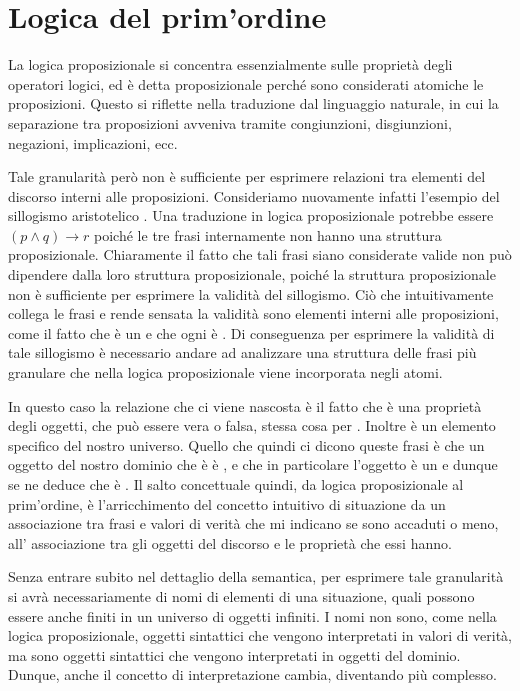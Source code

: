 \chapter{Logica del prim'ordine}

La logica proposizionale si concentra essenzialmente sulle proprietà degli operatori logici, ed è detta proposizionale perché sono considerati atomiche le proposizioni. Questo si riflette nella traduzione dal linguaggio naturale, in cui la separazione tra proposizioni avveniva tramite congiunzioni, disgiunzioni, negazioni, implicazioni, ecc.

Tale granularità però non è sufficiente per esprimere relazioni tra elementi del discorso interni alle proposizioni. Consideriamo nuovamente infatti l'esempio del sillogismo aristotelico . Una traduzione in logica proposizionale potrebbe essere \((p\land q)\to r\) poiché le tre frasi internamente non hanno una struttura proposizionale. Chiaramente il fatto che tali frasi siano considerate valide non può dipendere dalla loro struttura proposizionale, poiché la struttura proposizionale non è sufficiente per esprimere la validità del sillogismo. Ciò che intuitivamente collega le frasi e rende sensata la validità sono elementi interni alle proposizioni, come il fatto che  è un  e che ogni  è . Di conseguenza per esprimere la validità di tale sillogismo è necessario andare ad analizzare una struttura delle frasi più granulare che nella logica proposizionale viene incorporata negli atomi.

In questo caso la relazione che ci viene nascosta è il fatto che  è una proprietà degli oggetti, che può essere vera o falsa, stessa cosa per . Inoltre  è un elemento specifico del nostro universo. Quello che quindi ci dicono queste frasi è che un oggetto del nostro dominio che è  è , e che in particolare l'oggetto  è un  e dunque se ne deduce che  è . Il salto concettuale quindi, da logica proposizionale al prim'ordine, è l'arricchimento del concetto intuitivo di situazione da un associazione tra frasi e valori di verità che mi indicano se sono accaduti o meno, all' associazione tra gli oggetti del discorso e le proprietà che essi hanno.

Senza entrare subito nel dettaglio della semantica, per esprimere tale granularità si avrà necessariamente di nomi di elementi di una situazione, quali possono essere anche finiti in un universo di oggetti infiniti. I nomi non sono, come nella logica proposizionale, oggetti sintattici che vengono interpretati in valori di verità, ma sono oggetti sintattici che vengono interpretati in oggetti del dominio. Dunque, anche il concetto di interpretazione cambia, diventando più complesso.

